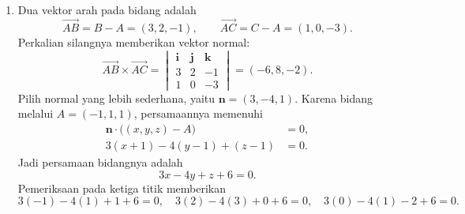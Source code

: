 \documentclass[11pt,a4paper]{article}
\newcommand{\vect}[1]{\overrightarrow{#1}}
\begin{document}
\begin{enumerate}
\begin{enumerate}
\item

Panjang kedua sisi dan perkalian titiknya adalah
\begin{align*}
    \|\mathbf{u}\|&=\sqrt{(-3)^2+(-2)^2+2^2}=\sqrt{17},\\
    \|\mathbf{v}\|&=\sqrt{(-2)^2+2^2+3^2}=\sqrt{17},\\
    \mathbf{u}\cdot\mathbf{v}&=(-3)(-2)+(-2)(2)+(2)(3)=8.
\end{align*}
Untuk sudut $\theta$ antara $\mathbf{u}$ dan $\mathbf{v}$, hubungan
$\mathbf{u}\cdot\mathbf{v}=\|\mathbf{u}\|\,\|\mathbf{v}\|\cos\theta$
memberikan
\[
    \cos\theta=\frac{\mathbf{u}\cdot\mathbf{v}}
                     {\|\mathbf{u}\|\,\|\mathbf{v}\|}
              =\frac8{\sqrt{17}\sqrt{17}}=\frac8{17}.
\]
Gunakan segitiga siku-siku bantu dengan perbandingan sisi samping
dan sisi miring $8:17$ untuk menentukan $\sin\theta$.
\begin{center}
\end{center}
Dengan Teorema Pythagoras, sisi di depan $\theta$ adalah
$\sqrt{17^2-8^2}=15$, sehingga
\[
    \sin\theta=\frac{\text{sisi depan}}{\text{sisi miring}}
              =\frac{15}{17}.
\]
Segitiga semula memiliki alas $\|\mathbf{u}\|$ dan tinggi
$\|\mathbf{v}\|\sin\theta$, maka luasnya
\[
    L=\frac12\|\mathbf{u}\|\,\|\mathbf{v}\|\sin\theta
     =\frac12\,\sqrt{17}\cdot\sqrt{17}\cdot\frac{15}{17}
     =\boxed{\frac{15}{2}\text{ satuan luas}}.
\]
\end{enumerate}

\item
Dua vektor arah pada bidang adalah
\[
    \vect{AB}=B-A=(3,2,-1),\qquad
    \vect{AC}=C-A=(1,0,-3).
\]
Perkalian silangnya memberikan vektor normal:
\[
    \vect{AB}\times\vect{AC}
    =\begin{vmatrix}
        \mathbf{i}&\mathbf{j}&\mathbf{k}\\
        3&2&-1\\
        1&0&-3
    \end{vmatrix}
    =(-6,8,-2).
\]
Pilih normal yang lebih sederhana, yaitu $\mathbf{n}=(3,-4,1)$.
Karena bidang melalui $A=(-1,1,1)$, persamaannya memenuhi
\begin{align*}
    \mathbf{n}\cdot\bigl((x,y,z)-A\bigr)&=0,\\
    3(x+1)-4(y-1)+(z-1)&=0.
\end{align*}
Jadi persamaan bidangnya adalah
\[
    \boxed{3x-4y+z+6=0}.
\]
Pemeriksaan pada ketiga titik memberikan
\[
    3(-1)-4(1)+1+6=0,\quad
    3(2)-4(3)+0+6=0,\quad
    3(0)-4(1)-2+6=0.
\]


\end{enumerate}
\end{document}
